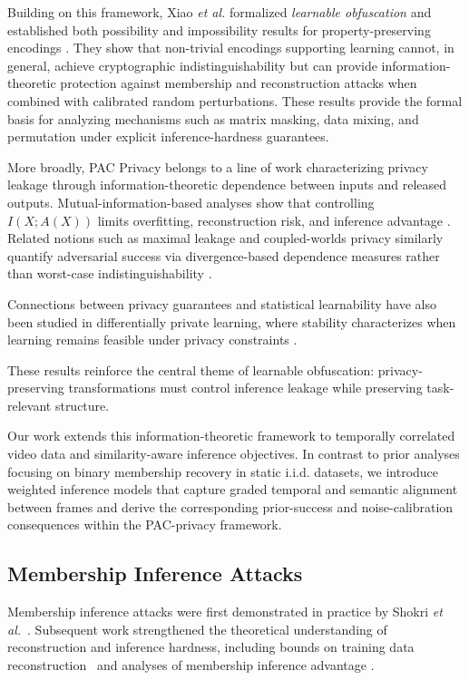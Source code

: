 \documentclass[sigconf,anonymous, review]{acmart}
\begin{document}
Building on this framework, Xiao \textit{et al.} formalized \emph{learnable obfuscation} and established both possibility and impossibility results for property-preserving encodings \cite{xiao2024formal}. They show that non-trivial encodings supporting learning cannot, in general, achieve cryptographic indistinguishability but can provide information-theoretic protection against membership and reconstruction attacks when combined with calibrated random perturbations. These results provide the formal basis for analyzing mechanisms such as matrix masking, data mixing, and permutation under explicit inference-hardness guarantees.

More broadly, PAC Privacy belongs to a line of work characterizing privacy leakage through information-theoretic dependence between inputs and released outputs. Mutual-information-based analyses show that controlling $I(X;A(X))$ limits overfitting, reconstruction risk, and inference advantage \cite{russo2016controlling,raginsky2016information,xu2017information}. Related notions such as maximal leakage and coupled-worlds privacy similarly quantify adversarial success via divergence-based dependence measures rather than worst-case indistinguishability \cite{esposito2019maximal,bassily2013coupled}.

Connections between privacy guarantees and statistical learnability have also been studied in differentially private learning, where stability characterizes when learning remains feasible under privacy constraints \cite{wang2016learning}.

These results reinforce the central theme of learnable obfuscation: privacy-preserving transformations must control inference leakage while preserving task-relevant structure.

Our work extends this information-theoretic framework to temporally correlated video data and similarity-aware inference objectives. In contrast to prior analyses focusing on binary membership recovery in static i.i.d. datasets, we introduce weighted inference models that capture graded temporal and semantic alignment between frames and derive the corresponding prior-success and noise-calibration consequences within the PAC-privacy framework.

\subsection{Membership Inference Attacks}

Membership inference attacks were first demonstrated in practice by Shokri \textit{et al.}~\cite{shokri2017membership}. Subsequent work strengthened the theoretical understanding of reconstruction and inference hardness, including bounds on training data reconstruction~\cite{balle2022reconstructing,guo2022bounding} and analyses of membership inference advantage \cite{carlini2022firstprinciples,thudi2022bounding,hilprecht2019monte}.
\end{document}

